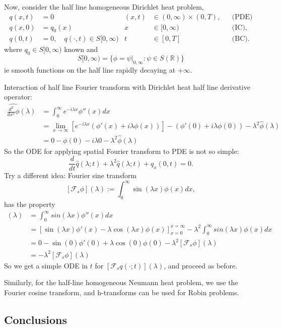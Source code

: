 Now, consider the half line homogeneous Dirichlet heat problem,
\begin{align*}
[\partial_t- \partial_{xx}]q(x,t) &= 0 &(x,t) &\in (0,\infty) \times (0,T),&  &\text{(PDE)}\\
q(x,0) &= q_0(x) & x &\in [0,\infty)& &\text{(IC)},\\
q(0,t) &= 0, \quad q(\cdot,t) \in S[0,\infty) & t &\in [0,T] & &\text{(BC)}. 
\end{align*}
where $q_0 \in S[0,\infty)$ known and
$$S[0,\infty) = \{\phi = \psi|_{0,\infty}: \psi\in S(\mathbb{R})\}$$ ie smooth functions on the half line rapidly decaying at $+\infty$.

Interaction of half line Fourier transform with Dirichlet heat half line derivative operator:
\begin{align*}
\widehat{\frac{d^2}{dx^2}\phi}(\lambda) &= \int_{0}^{\infty}e^{-i\lambda x} \phi''(x)dx\\
&= \lim_{x\to\infty}\left[e^{-i\lambda x}(\phi'(x) + i\lambda\phi(x)) \right] - (\phi'(0) + i\lambda\phi(0)) - \lambda^2\widehat{\phi}(\lambda)\\
&= 0 - \phi(0) - i\lambda0 - \lambda^2\widehat{\phi}(\lambda)
\end{align*}
So the ODE for applying spatial Fourier transform to PDE is not so simple:
$$\frac{d}{dt}\widehat{q}(\lambda;t) + \lambda^2\widehat{q}(\lambda;t) + q_x(0,t) = 0.$$
Try a different idea: Fourier sine transform
$$[\mathcal{F}_s\phi](\lambda) := \int_{0}^{\infty}\sin(\lambda x)\phi(x)dx,$$
has the property
\begin{align*}
[\mathcal{F}_s\phi''](\lambda) &= \int_{0}^{\infty}sin(\lambda x)\phi''(x)dx\\
&= \left[\sin(\lambda x)\phi'(x) - \lambda\cos(\lambda x)\phi(x) \right]_{x=0}^{x=\infty} - \lambda^2\int_{0}^{\infty}sin(\lambda x)\phi(x)dx\\
&= 0 - \sin(0)\phi'(0) +\lambda \cos(0)\phi(0) - \lambda^2[\mathcal{F}_s\phi](\lambda)\\
&= - \lambda^2[\mathcal{F}_s\phi](\lambda)
\end{align*}
So we get a simple ODE in $t$ for $[\mathcal{F}_sq(\cdot;t)](\lambda) $, and proceed as before.

Similarly, for the half-line homogeneous Neumann heat problem, we use the Fourier cosine transform, and h-transforms can be used for Robin problems.

\subsection*{Conclusions}

